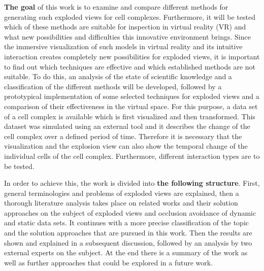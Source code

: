 \textbf{The goal} of this work is to examine and compare different methods for generating such exploded views for cell complexes. Furthermore, it will be tested which of these methods are suitable for inspection in virtual reality (VR) and what new possibilities and difficulties this innovative environment brings.
Since the immersive visualization of such models in virtual reality and its intuitive interaction creates completely new possibilities for exploded views, it is important to find out which techniques are effective and which established methods are not suitable.
To do this, an analysis of the state of scientific knowledge and a classification of the different methods will be developed, followed by a prototypical implementation of some selected techniques for exploded views and a comparison of their effectiveness in the virtual space.
For this purpose, a data set of a cell complex is available which is first visualized and then transformed. 
This dataset was simulated using an external tool and it describes the change of the cell complex over a defined period of time. 
Therefore it is necessary that the visualization and the explosion view can also show the temporal change of the individual cells of the cell complex.
Furthermore, different interaction types are to be tested. 

In order to achieve this, the work is divided into \textbf{the following structure}. 
First, general terminologies and problems of exploded views are explained, then a thorough literature analysis takes place on related works and their solution approaches on the subject of exploded views and occlusion avoidance of dynamic and static data sets.
It continues with a more precise classification of the topic and the solution approaches that are pursued in this work. 
Then the results are shown and explained in a subsequent discussion, followed by an analysis by two external experts on the subject. At the end there is a summary of the work as well as further approaches that could be explored in a future work.

